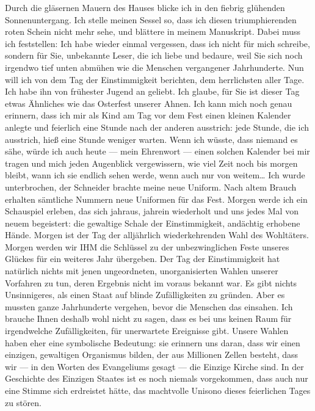 Durch die gläsernen Mauern des Hauses blicke ich in den fiebrig
glühenden Sonnenuntergang. Ich stelle meinen Sessel so, dass ich
diesen triumphierenden roten Schein nicht mehr sehe, und blättere
in meinem Manuskript. Dabei muss ich feststellen: Ich habe wieder
einmal vergessen, dass ich nicht für mich schreibe, sondern für
Sie, unbekannte Leser, die ich liebe und bedaure, weil Sie sich
noch irgendwo tief unten abmühen wie die Menschen vergangener
Jahrhunderte. Nun will ich von dem Tag der Einstimmigkeit
berichten, dem herrlichsten aller Tage. Ich habe ihn von frühester
Jugend an geliebt. Ich glaube, für Sie ist dieser Tag etwas
Ähnliches wie das Osterfest unserer Ahnen. Ich kann mich noch genau
erinnern, dass ich mir als Kind am Tag vor dem Fest einen kleinen
Kalender anlegte und feierlich eine Stunde nach der anderen
ausstrich: jede Stunde, die ich ausstrich, hieß eine Stunde weniger
warten. Wenn ich wüsste, dass niemand es sähe, würde ich auch heute
— mein Ehrenwort — einen solchen Kalender bei mir tragen und mich
jeden Augenblick vergewissern, wie viel Zeit noch bis morgen
bleibt, wann ich sie endlich sehen werde, wenn auch nur von
weitem\ldots{} Ich wurde unterbrochen, der Schneider brachte meine neue
Uniform. Nach altem Brauch erhalten sämtliche Nummern neue
Uniformen für das Fest. Morgen werde ich ein Schauspiel erleben,
das sich jahraus, jahrein wiederholt und uns jedes Mal von neuem
begeistert: die gewaltige Schale der Einstimmigkeit, andächtig
erhobene Hände. Morgen ist der Tag der alljährlich wiederkehrenden
Wahl des Wohltäters. Morgen werden wir IHM die Schlüssel zu der
unbezwinglichen Feste unseres Glückes für ein weiteres Jahr
übergeben. Der Tag der Einstimmigkeit hat natürlich nichts mit
jenen ungeordneten, unorganisierten Wahlen unserer Vorfahren zu
tun, deren Ergebnis nicht im voraus bekannt war. Es gibt nichts
Unsinnigeres, als einen Staat auf blinde Zufälligkeiten zu gründen.
Aber es mussten ganze Jahrhunderte vergehen, bevor die Menschen das
einsahen. Ich brauche Ihnen deshalb wohl nicht zu sagen, dass es
bei uns keinen Raum für irgendwelche Zufälligkeiten, für
unerwartete Ereignisse gibt. Unsere Wahlen haben eher eine
symbolische Bedeutung: sie erinnern uns daran, dass wir einen
einzigen, gewaltigen Organismus bilden, der aus Millionen Zellen
besteht, dass wir — in den Worten des Evangeliums gesagt — die
Einzige Kirche sind. In der Geschichte des Einzigen Staates ist es
noch niemals vorgekommen, dass auch nur eine Stimme sich erdreistet
hätte, das machtvolle Unisono dieses feierlichen Tages zu stören.

